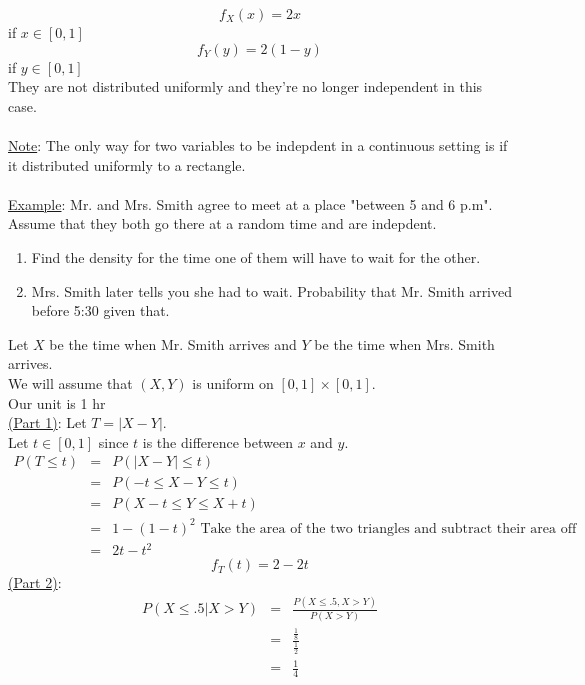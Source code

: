   $$
    f_X(x) = 2x
  $$
  if $x \in [0,1]$
  $$
    f_Y(y) = 2(1-y)
  $$
  if $y \in [0,1]$\\
  They are not distributed uniformly and they're no longer independent in this
  case.\\\\
  \underline{Note}: The only way for two variables to be indepdent in a 
  continuous setting is if it distributed uniformly to a rectangle.\\\\
  \underline{Example}: Mr. and Mrs. Smith agree to meet at a place "between
  5 and 6 p.m". Assume that they both go there at a random time and are 
  indepdent.\\
  \begin{enumerate}
    \item Find the density for the time one of them will have to wait for the 
    other.
    \item Mrs. Smith later tells you she had to wait. Probability that Mr. Smith
      arrived before 5:30 given that.
  \end{enumerate}
  Let $X$ be the time when Mr. Smith arrives and
  $Y$ be the time when Mrs. Smith arrives.\\
  We will assume that $(X,Y)$ is uniform on $[0,1] \times [0,1]$.\\
  Our unit is 1 hr\\
  \underline{(Part 1)}: Let $T = |X - Y|$.\\
  Let $t \in [0,1]$ since $t$ is the difference between $x$ and $y$.
  \begin{eqnarray*}
    P(T \le t) & = & P(|X - Y| \le t)\\
      & = & P(-t \le X - Y \le t)\\
      & = & P(X - t \le Y \le X + t)\\
      & = & 1 - (1-t)^2 \text{ Take the area of the two triangles and subtract
        their area off the unit square}\\
      & = & 2t - t^2
  \end{eqnarray*}
  $$
    f_T(t) = 2 - 2t
  $$
  \underline{(Part 2)}: 
  \begin{eqnarray*}
    P( X \le .5 | X > Y ) & = & \frac{P(X \le .5, X > Y)}{P(X > Y)}\\
      & = & \frac{\frac{1}{8}}{\frac{1}{2}}\\
      & = & \frac{1}{4}\\
  \end{eqnarray*}
  \\\\
